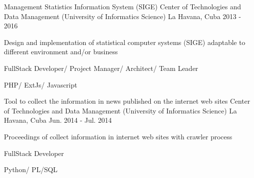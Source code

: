 \begin{cventries}

\cventry
{Management Statistics Information System (SIGE)} %
{Center of Technologies and Data Management (University of Informatics Science)} %
{La Havana, Cuba} %
{2013 - 2016} %
{ %
\begin{cvitems}
\item {Design and implementation of statistical computer systems (SIGE) adaptable to different environment and/or business}
\item {FullStack Developer/ Project Manager/ Architect/ Team Leader}
\item {PHP/ ExtJs/ Javascript}
\end{cvitems}
}


\cventry
{Tool to collect the information in news published on the internet web sites} %
{Center of Technologies and Data Management (University of Informatics Science)} %
{La Havana, Cuba} %
{Jun. 2014 - Jul. 2014} %
{ %
\begin{cvitems}
\item {Proceedings of collect information in internet web sites with crawler process}
\item {FullStack Developer}
\item {Python/ PL/SQL}
\end{cvitems}
}


\end{cventries}

